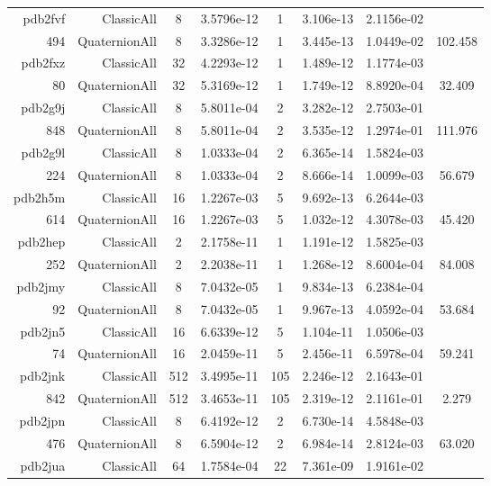 \begin{xltabular}{\textwidth}{r|rcS[table-format=1.4e+2]cS[table-format=1.3e+2]S[table-format=1.4e+2]S[table-format=-1.3]}
pdb2fvf & ClassicAll & 8 & 3.5796e-12 & 1 & 3.106e-13 & 2.1156e-02 & \\
494 & QuaternionAll & 8 & 3.3286e-12 & 1 & 3.445e-13 & 1.0449e-02 & 102.458\\  \addlinespace
pdb2fxz & ClassicAll & 32 & 4.2293e-12 & 1 & 1.489e-12 & 1.1774e-03 & \\
80 & QuaternionAll & 32 & 5.3169e-12 & 1 & 1.749e-12 & 8.8920e-04 & 32.409\\  \addlinespace
pdb2g9j & ClassicAll & 8 & 5.8011e-04 & 2 & 3.282e-12 & 2.7503e-01 & \\
848 & QuaternionAll & 8 & 5.8011e-04 & 2 & 3.535e-12 & 1.2974e-01 & 111.976\\  \addlinespace
pdb2g9l & ClassicAll & 8 & 1.0333e-04 & 2 & 6.365e-14 & 1.5824e-03 & \\
224 & QuaternionAll & 8 & 1.0333e-04 & 2 & 8.666e-14 & 1.0099e-03 & 56.679\\  \addlinespace
pdb2h5m & ClassicAll & 16 & 1.2267e-03 & 5 & 9.692e-13 & 6.2644e-03 & \\
614 & QuaternionAll & 16 & 1.2267e-03 & 5 & 1.032e-12 & 4.3078e-03 & 45.420\\  \addlinespace
pdb2hep & ClassicAll & 2 & 2.1758e-11 & 1 & 1.191e-12 & 1.5825e-03 & \\
252 & QuaternionAll & 2 & 2.2038e-11 & 1 & 1.268e-12 & 8.6004e-04 & 84.008\\  \addlinespace
pdb2jmy & ClassicAll & 8 & 7.0432e-05 & 1 & 9.834e-13 & 6.2384e-04 & \\
92 & QuaternionAll & 8 & 7.0432e-05 & 1 & 9.967e-13 & 4.0592e-04 & 53.684\\  \addlinespace
pdb2jn5 & ClassicAll & 16 & 6.6339e-12 & 5 & 1.104e-11 & 1.0506e-03 & \\
74 & QuaternionAll & 16 & 2.0459e-11 & 5 & 2.456e-11 & 6.5978e-04 & 59.241\\  \addlinespace
pdb2jnk & ClassicAll & 512 & 3.4995e-11 & 105 & 2.246e-12 & 2.1643e-01 & \\
842 & QuaternionAll & 512 & 3.4653e-11 & 105 & 2.319e-12 & 2.1161e-01 & 2.279\\  \addlinespace
pdb2jpn & ClassicAll & 8 & 6.4192e-12 & 2 & 6.730e-14 & 4.5848e-03 & \\
476 & QuaternionAll & 8 & 6.5904e-12 & 2 & 6.984e-14 & 2.8124e-03 & 63.020\\  \addlinespace
pdb2jua & ClassicAll & 64 & 1.7584e-04 & 22 & 7.361e-09 & 1.9161e-02 & \\

\end{xltabular}
